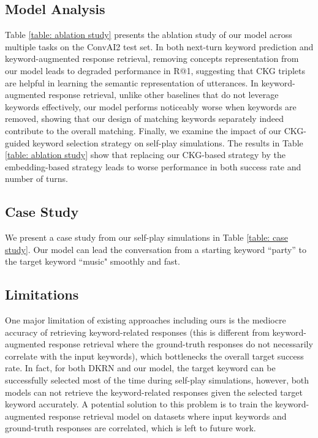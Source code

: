 \documentclass[letterpaper]{article} %
\begin{document}
\subsection{Model Analysis}
\label{sec: model analysis}

Table \ref{table: ablation study} presents the ablation study of our model across multiple tasks on the ConvAI2 test set. In both next-turn keyword prediction and keyword-augmented response retrieval, removing concepts representation from our model leads to degraded performance in R@1, suggesting that CKG triplets are helpful in learning the semantic representation of utterances. In keyword-augmented response retrieval, unlike other baselines that do not leverage keywords effectively, our model performs noticeably worse when keywords are removed, showing that our design of matching keywords separately indeed contribute to the overall matching. Finally, we examine the impact of our CKG-guided keyword selection strategy on self-play simulations. The results in Table \ref{table: ablation study} show that replacing our CKG-based strategy by the embedding-based strategy \cite{tang2019target, qin2020dynamic} leads to worse performance in both success rate and number of turns.

\vspace{-0.76mm}
\subsection{Case Study}
\label{sec: case study}
We present a case study from our self-play simulations in Table \ref{table: case study}. Our model can lead the conversation from a starting keyword ``party'' to the target keyword ``music" smoothly and fast.

\subsection{Limitations}
\label{sec: limitations}
One major limitation of existing approaches including ours is the mediocre accuracy of retrieving keyword-related responses (this is different from keyword-augmented response retrieval where the ground-truth responses do not necessarily correlate with the input keywords), which bottlenecks the overall target success rate. In fact, for both DKRN and our model, the target keyword can be successfully selected most of the time during self-play simulations, however, both models can not retrieve the keyword-related responses given the selected target keyword accurately. A potential solution to this problem is to train the keyword-augmented response retrieval model on datasets where input keywords and ground-truth responses are correlated, which is left to future work.
\end{document}
